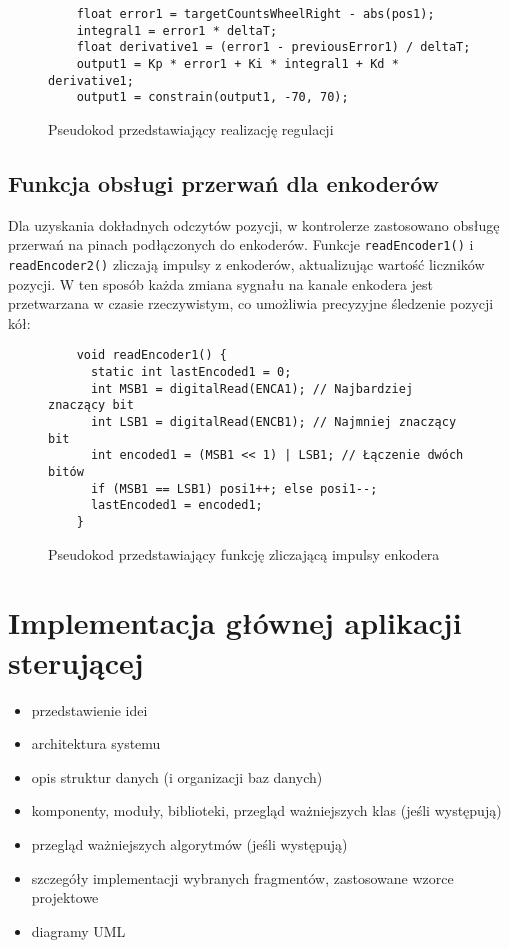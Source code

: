 \begin{figure}[H]
  \centering
  \begin{lstlisting}
    float error1 = targetCountsWheelRight - abs(pos1);
    integral1 = error1 * deltaT;
    float derivative1 = (error1 - previousError1) / deltaT;
    output1 = Kp * error1 + Ki * integral1 + Kd * derivative1;
    output1 = constrain(output1, -70, 70);
  \end{lstlisting}
  \caption{Pseudokod przedstawiający realizację regulacji}
  \label{fig:pseudokod:pid}
  \end{figure}

\subsection{Funkcja obsługi przerwań dla enkoderów}

Dla uzyskania dokładnych odczytów pozycji, w kontrolerze zastosowano obsługę przerwań na pinach podłączonych do enkoderów. Funkcje \texttt{readEncoder1()} i \texttt{readEncoder2()} zliczają impulsy z enkoderów, aktualizując wartość liczników pozycji. W ten sposób każda zmiana sygnału na kanale enkodera jest przetwarzana w czasie rzeczywistym, co umożliwia precyzyjne śledzenie pozycji kół:

\begin{figure}[H]
  \centering
  \begin{lstlisting}
    void readEncoder1() {
      static int lastEncoded1 = 0;
      int MSB1 = digitalRead(ENCA1); // Najbardziej znaczący bit
      int LSB1 = digitalRead(ENCB1); // Najmniej znaczący bit
      int encoded1 = (MSB1 << 1) | LSB1; // Łączenie dwóch bitów
      if (MSB1 == LSB1) posi1++; else posi1--;
      lastEncoded1 = encoded1;
    }
  \end{lstlisting}
  \caption{Pseudokod przedstawiający funkcję zliczającą impulsy enkodera}
  \label{fig:pseudokod:config-pid}
\end{figure}


\section{Implementacja głównej aplikacji sterującej}



\begin{itemize}
\item przedstawienie idei
\item architektura systemu
\item opis struktur danych (i organizacji baz danych)
\item komponenty, moduły, biblioteki, przegląd ważniejszych klas (jeśli występują)
\item przegląd ważniejszych algorytmów (jeśli występują)
\item szczegóły implementacji wybranych fragmentów, zastosowane wzorce projektowe
\item diagramy UML
\end{itemize}


